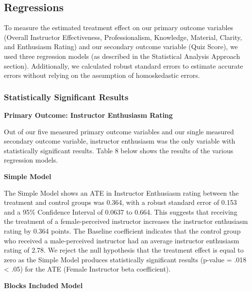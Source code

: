\documentclass[
]{article}
\begin{document}
\hypertarget{regressions}{%
\subsection{Regressions}\label{regressions}}

To measure the estimated treatment effect on our primary outcome
variables (Overall Instructor Effectiveness, Professionalism, Knowledge,
Material, Clarity, and Enthusiasm Rating) and our secondary outcome
variable (Quiz Score), we used three regression models (as described in
the Statistical Analysis Approach section). Additionally, we calculated
robust standard errors to estimate accurate errors without relying on
the assumption of homoskedastic errors.

\hypertarget{statistically-significant-results}{%
\subsubsection{Statistically Significant
Results}\label{statistically-significant-results}}

\textbf{Primary Outcome: Instructor Enthusiasm Rating}

Out of our five measured primary outcome variables and our single
measured secondary outcome variable, instructor enthusiasm was the only
variable with statistically significant results. Table 8 below shows the
results of the various regression models.

\textbf{Simple Model}

The Simple Model shows an ATE in Instructor Enthusiasm rating between
the treatment and control groups was 0.364, with a robust standard error
of 0.153 and a 95\% Confidence Interval of 0.0637 to 0.664. This
suggests that receiving the treatment of a female-perceived instructor
increases the instructor enthusiasm rating by 0.364 points. The Baseline
coefficient indicates that the control group who received a
male-perceived instructor had an average instructor enthusiasm rating of
2.78. We reject the null hypothesis that the treatment effect is equal
to zero as the Simple Model produces statistically significant results
(p-value = .018 \textless{} .05) for the ATE (Female Instructor beta
coefficient).

\textbf{Blocks Included Model}
\end{document}
